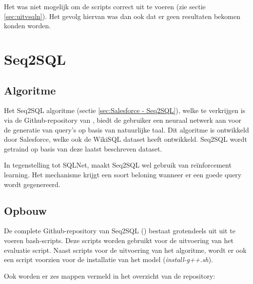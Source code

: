 Het was niet mogelijk om de scripts correct uit te voeren (zie sectie \ref{sec:uitvsqln}). Het gevolg hiervan was dan ook dat er geen resultaten bekomen konden worden. 

\section{Seq2SQL}

\subsection{Algoritme}

Het Seq2SQL algoritme (sectie \ref{sec:Salesforce - Seq2SQL}), welke te verkrijgen is via de Github-repository van \textcite{seq2sql}, biedt de gebruiker een neuraal netwerk aan voor de generatie van query's op basis van natuurlijke taal. Dit algoritme is ontwikkeld door Salesforce, welke ook de WikiSQL dataset heeft ontwikkeld. Seq2SQL wordt getraind op basis van deze laatst beschreven dataset.

In tegenstelling tot SQLNet, maakt Seq2SQL wel gebruik van reïnforcement learning. Het mechanisme krijgt een soort beloning wanneer er een goede query wordt gegenereerd. 

\subsection{Opbouw}

De complete Github-repository van Seq2SQL (\textcite{seq2sql}) bestaat grotendeels uit uit te voeren bash-scripts. Deze scripts worden gebruikt voor de uitvoering van het evaluatie script. Naast scripts voor de uitvoering van het algoritme, wordt er ook een script voorzien voor de installatie van het model (\textit{install-g++.sh}).

Ook worden er zes mappen vermeld in het overzicht van de repository:

